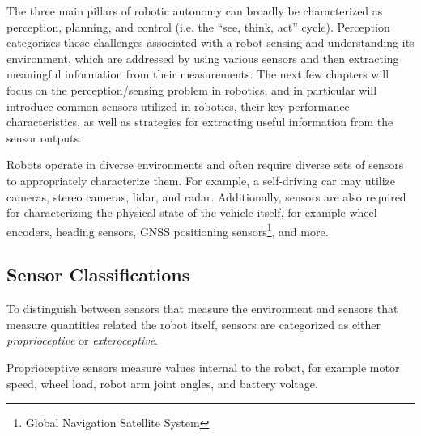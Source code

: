 The three main pillars of robotic autonomy can broadly be characterized as perception, planning, and control (i.e. the ``see, think, act'' cycle). Perception categorizes those challenges associated with a robot sensing and understanding its environment, which are addressed by using various sensors and then extracting meaningful information from their measurements. The next few chapters will focus on the perception/sensing problem in robotics, and in particular will introduce common sensors utilized in robotics, their key performance characteristics, as well as strategies for extracting useful information from the sensor outputs.

\nocite{SiegwartNourbakhshEtAl2011}
Robots operate in diverse environments and often require diverse sets of sensors to appropriately characterize them. For example, a self-driving car may utilize cameras, stereo cameras, lidar, and radar. Additionally, sensors are also required for characterizing the physical state of the vehicle itself, for example wheel encoders, heading sensors, GNSS positioning sensors\footnote{Global Navigation Satellite System}, and more\cite[\baselineskip]{SiegwartNourbakhshEtAl2011}. 

\subsection{Sensor Classifications}
To distinguish between sensors that measure the environment and sensors that measure quantities related the robot itself, sensors are categorized as either \textit{proprioceptive} or \textit{exteroceptive}.
\begin{definition}[Proprioceptive]
Proprioceptive sensors measure values internal to the robot, for example motor speed, wheel load, robot arm joint angles, and battery voltage.
\end{definition}

